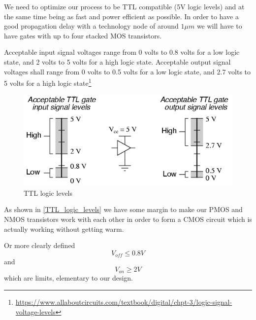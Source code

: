 We need to optimize our process to be TTL compatible (5V logic levels) and at the same time being as fast and power efficient as possible.
In order to have a good propagation delay with a technology node of around $1\mu m$ we will have to have gates with up to four stacked MOS transistors.

Acceptable input signal voltages range from 0 volts to 0.8 volts for a low logic state, and 2 volts to 5 volts for a high logic state.
Acceptable output signal voltages shall range from 0 volts to 0.5 volts for a low logic state, and 2.7 volts to 5 volts for a high logic state\footnote{\url{https://www.allaboutcircuits.com/textbook/digital/chpt-3/logic-signal-voltage-levels}}

\begin{figure}[H]
	\centering
	\includegraphics[scale=0.5]{logic_levels.png}
	\caption{TTL logic levels}
	\label{TTL_logic_levels}
\end{figure}

As shown in \autoref{TTL_logic_levels} we have some margin to make our PMOS and NMOS transistors work with each other in order to form a CMOS circuit which is actually working without getting warm.

Or more clearly defined
\begin{equation}
V_{off} \leq 0.8V
\end{equation}
and
\begin{equation}
V_{on} \geq 2V
\end{equation}
which are limits, elementary to our design.